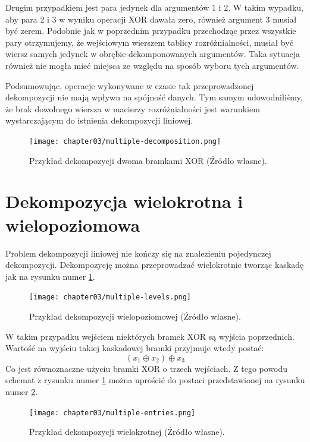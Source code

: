 Drugim przypadkiem jest para jedynek dla argumentów 1 i 2.
W takim wypadku,
aby para 2 i 3 w wyniku operacji XOR dawała zero,
również argument 3 musiał być zerem.
Podobnie jak w poprzednim przypadku przechodząc przez wszystkie pary otrzymujemy,
że wejściowym wierszem tablicy rozróżnialności,
musiał być wiersz samych jedynek w obrębie dekomponowanych argumentów.
Taka sytuacja również nie mogła mieć miejsca ze względu na sposób wyboru tych argumentów.

Podsumowując,
operacje wykonywane w czasie tak przeprowadzonej dekompozycji nie mają wpływu na spójność danych.
Tym samym udowodniliśmy,
że brak dowolnego wiersza w macierzy rozróżnialności jest warunkiem wystarczającym do istnienia dekompozycji liniowej.

\begin{figure}[H]
\centering
\texttt{[image: chapter03/multiple-decomposition.png]}
\caption{Przykład dekompozycji dwoma bramkami XOR (Źródło własne).}
\end{figure}

\section{Dekompozycja wielokrotna i wielopoziomowa}

Problem dekompozycji liniowej nie kończy się na znalezieniu pojedynczej dekompozycji.
Dekompozycję można przeprowadzać wielokrotnie tworząc kaskadę jak na rysunku numer \ref{fig:multiple-levels}.

\begin{figure}[H]
\centering
\texttt{[image: chapter03/multiple-levels.png]}
\caption{Przykład dekompozycji wielopoziomowej (Źródło własne).}
\label{fig:multiple-levels}
\end{figure}

W takim przypadku wejściem niektórych bramek XOR są wyjścia poprzednich.
Wartość na wyjściu takiej kaskadowej bramki przyjmuje wtedy postać:
\begin{equation}
(x_1 \oplus x_2) \oplus x_3
\end{equation}
Co jest równoznaczne użyciu bramki XOR o trzech wejściach.
Z tego powodu schemat z rysunku numer \ref{fig:multiple-levels} można uprościć do postaci przedstawionej na rysunku numer \ref{fig:multiple-entries}.

\begin{figure}[H]
\centering
\texttt{[image: chapter03/multiple-entries.png]}
\caption{Przykład dekompozycji wielokrotnej (Źródło własne).}
\label{fig:multiple-entries}
\end{figure}

